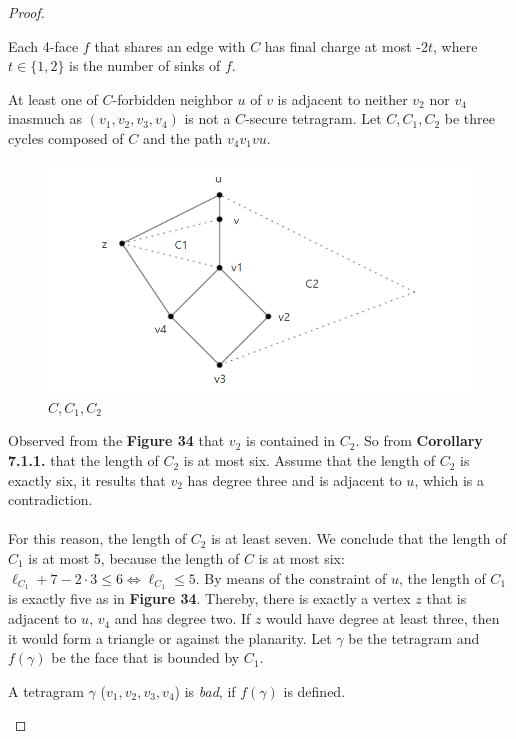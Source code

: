 \begin{proof}
\begin{itemize}
\begin{itemize}
        \begin{observation}
        Each 4-face $f$ that shares an edge with $C$ has final charge at most -2$t$, where $t \in \{1, 2\}$ is the number of sinks of $f$.
        \end{observation}
        
        At least one of $C$-forbidden neighbor $u$ of $v$ is adjacent to neither $v_2$ nor $v_4$ inasmuch as $(v_1, v_2, v_3, v_4)$ is not a $C$-secure tetragram. Let $C, C_1, C_2$ be three cycles composed of $C$ and the path $v_4v_1vu$. 
        \begin{figure}[H] %
            \centering %
            \includegraphics[width=0.8 \textwidth]{figure/cc1c2.png} 
            \caption{$C, C_1, C_2$} %
            \label{figure} %
        \end{figure}
        Observed from the \textbf{Figure 34} that $v_2$ is contained in $C_2$. So from \textbf{Corollary 7.1.1.} that the length of $C_2$ is at most six. Assume that the length of $C_2$ is exactly six, it results that $v_2$ has degree three and is adjacent to $u$, which is a contradiction.\\ \\
        For this reason, the length of $C_2$ is at least seven. We conclude that the length of $C_1$ is at most 5, because the length of $C$ is at most six: $\ell_{C_1} + 7 - 2 \cdot 3 \leq 6 \Longleftrightarrow \ell_{C_1} \leq 5$. By means of the constraint of $u$, the length of $C_1$ is exactly five as in \textbf{Figure 34}. Thereby, there is exactly a vertex $z$ that is adjacent to $u$, $v_4$ and has degree two. If $z$ would have degree at least three, then it would form a triangle or against the planarity. Let $\gamma$ be the tetragram and $f(\gamma)$ be the face that is bounded by $C_1$. 
        \begin{definition}
        A tetragram $\gamma$ ($v_1, v_2, v_3, v_4$) is \textit{bad}, if $f(\gamma)$ is defined. 
        \end{definition}
        

\end{itemize}
\end{itemize}
\end{proof}
